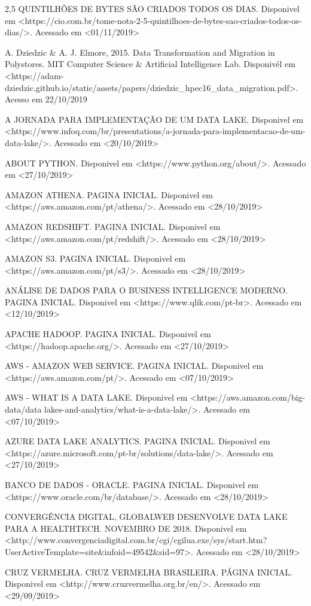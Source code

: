 \documentclass[
	12pt,				%
	openright,			%
	oneside,			%
	a4paper,			%
	chapter=TITLE,		%
	section=TITLE,		%
	subsection=TITLE,	%
	subsubsection=TITLE,%
	english,			%
	brazil				%
	]{abntex2}
\theoremstyle{definition}
\begin{document}
2,5 QUINTILHÕES DE BYTES SÃO CRIADOS TODOS OS DIAS. Disponivel em <https://cio.com.br/tome-nota-2-5-quintilhoes-de-bytes-sao-criados-todos-os-dias/>. Acessado em <01/11/2019>

A. Dziedzic & A. J. Elmore, 2015. Data Transformation and Migration in Polystores. MIT Computer Science & Artificial Intelligence Lab. Disponivél em <https://adam-dziedzic.github.io/static/assets/papers/dziedzic_hpec16_data_migration.pdf>. Acesso em 22/10/2019

A JORNADA PARA IMPLEMENTAÇÃO DE UM DATA LAKE. Disponivel em <https://www.infoq.com/br/presentations/a-jornada-para-implementacao-de-um-data-lake/>. Acessado em <20/10/2019>

ABOUT PYTHON. Disponivel em <https://www.python.org/about/>. Acessado em <27/10/2019>

AMAZON ATHENA. PAGINA INICIAL. Disponivel em <https://aws.amazon.com/pt/athena/>. Acessado em <28/10/2019>

AMAZON REDSHIFT. PAGINA INICIAL. Disponivel em <https://aws.amazon.com/pt/redshift/>. Acessado em <28/10/2019>

AMAZON S3. PAGINA INICIAL. Disponivel em <https://aws.amazon.com/pt/s3/>. Acessado em <28/10/2019>

ANÁLISE DE DADOS PARA O BUSINESS INTELLIGENCE MODERNO. PAGINA INICIAL. Disponivel em <https://www.qlik.com/pt-br>. Acessado em <12/10/2019>

APACHE HADOOP. PAGINA INICIAL. Disponivel em <https://hadoop.apache.org/>. Acessado em <27/10/2019>

AWS - AMAZON WEB SERVICE. PAGINA INICIAL. Disponivel em <https://aws.amazon.com/pt/>. Acessado em <07/10/2019>

AWS - WHAT IS A DATA LAKE. Disponivel em <https://aws.amazon.com/big-data/data lakes-and-analytics/what-is-a-data-lake/>. Acessado em <07/10/2019>

AZURE DATA LAKE ANALYTICS. PAGINA INICIAL. Disponivel em <https://azure.microsoft.com/pt-br/solutions/data-lake/>. Acessado em <27/10/2019>

BANCO DE DADOS - ORACLE. PAGINA INICIAL. Disponivel em <https://www.oracle.com/br/database/>. Acessado em <28/10/2019>

CONVERGÊNCIA DIGITAL, GLOBALWEB DESENVOLVE DATA LAKE PARA A HEALTHTECH. NOVEMBRO DE 2018. Disponivel em <http://www.convergenciadigital.com.br/cgi/cgilua.exe/sys/start.htm?UserActiveTemplate=site&infoid=49542&sid=97>. Acessado em <28/10/2019>

CRUZ VERMELHA. CRUZ VERMELHA BRASILEIRA. PÁGINA INICIAL. Disponivel em <http://www.cruzvermelha.org.br/en/>. Acessado em <29/09/2019>
\end{document}
